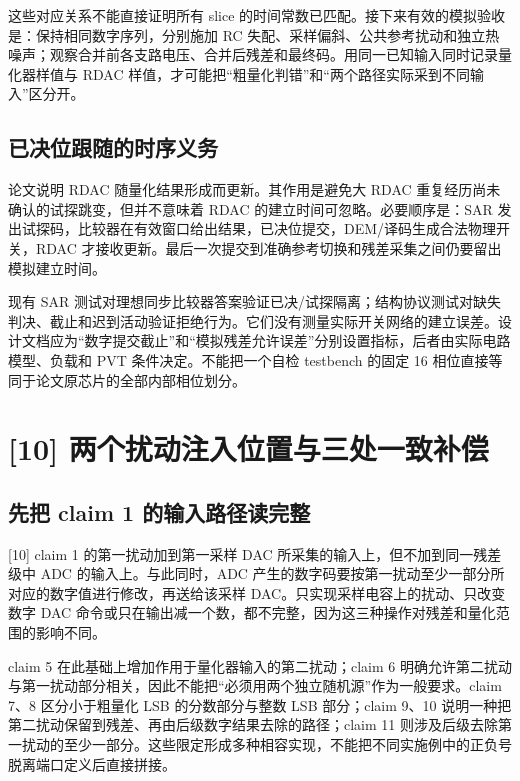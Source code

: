 这些对应关系不能直接证明所有 slice 的时间常数已匹配。接下来有效的模拟验收是：保持相同数字序列，分别施加 RC 失配、采样偏斜、公共参考扰动和独立热噪声；观察合并前各支路电压、合并后残差和最终码。用同一已知输入同时记录量化器样值与 RDAC 样值，才可能把“粗量化判错”和“两个路径实际采到不同输入”区分开。

\subsection{已决位跟随的时序义务}
论文说明 RDAC 随量化结果形成而更新。其作用是避免大 RDAC 重复经历尚未确认的试探跳变，但并不意味着 RDAC 的建立时间可忽略。必要顺序是：SAR 发出试探码，比较器在有效窗口给出结果，已决位提交，DEM/译码生成合法物理开关，RDAC 才接收更新。最后一次提交到准确参考切换和残差采集之间仍要留出模拟建立时间。

现有 SAR 测试对理想同步比较器答案验证已决/试探隔离；结构协议测试对缺失判决、截止和迟到活动验证拒绝行为。它们没有测量实际开关网络的建立误差。设计文档应为“数字提交截止”和“模拟残差允许误差”分别设置指标，后者由实际电路模型、负载和 PVT 条件决定。不能把一个自检 testbench 的固定 16 相位直接等同于论文原芯片的全部内部相位划分。

\section{[10] 两个扰动注入位置与三处一致补偿}
\subsection{先把 claim 1 的输入路径读完整}
[10] claim 1 的第一扰动加到第一采样 DAC 所采集的输入上，但不加到同一残差级中 ADC 的输入上。与此同时，ADC 产生的数字码要按第一扰动至少一部分所对应的数字值进行修改，再送给该采样 DAC。只实现采样电容上的扰动、只改变数字 DAC 命令或只在输出减一个数，都不完整，因为这三种操作对残差和量化范围的影响不同。

claim 5 在此基础上增加作用于量化器输入的第二扰动；claim 6 明确允许第二扰动与第一扰动部分相关，因此不能把“必须用两个独立随机源”作为一般要求。claim 7、8 区分小于粗量化 LSB 的分数部分与整数 LSB 部分；claim 9、10 说明一种把第二扰动保留到残差、再由后级数字结果去除的路径；claim 11 则涉及后级去除第一扰动的至少一部分。这些限定形成多种相容实现，不能把不同实施例中的正负号脱离端口定义后直接拼接。


